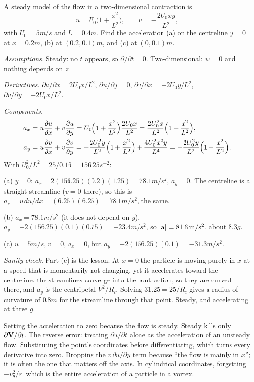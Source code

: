 \begin{example}
A steady model of the flow in a two-dimensional contraction is
\[
u = U_0\Big(1 + \frac{x^2}{L^2}\Big), \qquad v = -\frac{2U_0 xy}{L^2},
\]
with $U_0 = 5\unit{m/s}$ and $L = 0.4\unit{m}$. Find the acceleration (a) on the centreline $y = 0$ at $x = 0.2\unit{m}$, (b) at $(0.2, 0.1)\unit{m}$, and (c) at $(0, 0.1)\unit{m}$.

\emph{Assumptions.} Steady: no $t$ appears, so $\partial/\partial t = 0$. Two-dimensional: $w = 0$ and nothing depends on $z$.

\emph{Derivatives.} $\partial u/\partial x = 2U_0x/L^2$, $\partial u/\partial y = 0$, $\partial v/\partial x = -2U_0y/L^2$, $\partial v/\partial y = -2U_0x/L^2$.

\emph{Components.}
\begin{align*}
a_x &= u\frac{\partial u}{\partial x} + v\frac{\partial u}{\partial y} = U_0\Big(1 + \frac{x^2}{L^2}\Big)\frac{2U_0x}{L^2} = \frac{2U_0^2 x}{L^2}\Big(1 + \frac{x^2}{L^2}\Big), \\
a_y &= u\frac{\partial v}{\partial x} + v\frac{\partial v}{\partial y} = -\frac{2U_0^2y}{L^2}\Big(1 + \frac{x^2}{L^2}\Big) + \frac{4U_0^2x^2y}{L^4} = -\frac{2U_0^2y}{L^2}\Big(1 - \frac{x^2}{L^2}\Big).
\end{align*}
With $U_0^2/L^2 = 25/0.16 = 156.25\unit{s^{-2}}$:

(a) $y = 0$: $a_x = 2(156.25)(0.2)(1.25) = 78.1\unit{m/s^2}$, $a_y = 0$. The centreline is a straight streamline ($v = 0$ there), so this is $a_s = u\,du/dx = (6.25)(6.25) = 78.1\unit{m/s^2}$, the same.

(b) $a_x = 78.1\unit{m/s^2}$ (it does not depend on $y$), $a_y = -2(156.25)(0.1)(0.75) = -23.4\unit{m/s^2}$, so $|\mathbf{a}| = 81.6\,\mathrm{m/s^2}$, about $8.3g$.

(c) $u = 5\unit{m/s}$, $v = 0$, $a_x = 0$, but $a_y = -2(156.25)(0.1) = -31.3\unit{m/s^2}$.

\emph{Sanity check.} Part (c) is the lesson. At $x = 0$ the particle is moving purely in $x$ at a speed that is momentarily not changing, yet it accelerates toward the centreline: the streamlines converge into the contraction, so they are curved there, and $a_y$ is the centripetal $V^2/R_c$. Solving $31.25 = 25/R_c$ gives a radius of curvature of $0.8\unit{m}$ for the streamline through that point. Steady, and accelerating at three $g$.
\end{example}

\begin{trap}
Setting the acceleration to zero because the flow is steady. Steady kills only $\partial \mathbf{V}/\partial t$. The reverse error: treating $\partial u/\partial t$ alone as the acceleration of an unsteady flow. Substituting the point's coordinates before differentiating, which turns every derivative into zero. Dropping the $v\,\partial u/\partial y$ term because ``the flow is mainly in $x$''; it is often the one that matters off the axis. In cylindrical coordinates, forgetting $-v_\theta^2/r$, which is the entire acceleration of a particle in a vortex.
\end{trap}

